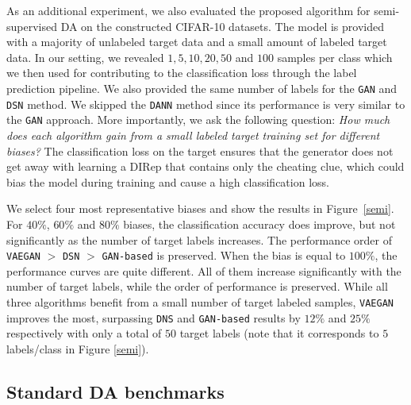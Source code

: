 \documentclass{article}
\begin{document}
As an additional experiment, we also evaluated the proposed algorithm for semi-supervised 
DA on the constructed CIFAR-10 datasets. The model is provided with a majority of unlabeled target data and a small amount of labeled target data. In our setting, we revealed $1, 5, 10, 20, 50$ and $100$ samples per class which we then used for contributing to the classification loss through the label prediction pipeline. We also provided the same number of labels for the \verb"GAN" and \verb"DSN" method. We skipped the \verb"DANN" method since its performance is very similar to the \verb"GAN" approach. More importantly, we ask the following question: \textit{How much does each algorithm gain from a small labeled target training set for different biases?} The classification loss on the target ensures that the generator does not get away with learning a DIRep that contains only the cheating clue, which could bias the model during training and cause a high classification loss.

We select four most representative biases and show the results in Figure~\ref{semi}. For $40\%$, $60\%$ and $80\%$ biases, the classification accuracy does improve, but not significantly as the number of target labels increases. The performance order of \verb"VAEGAN" $>$ \verb"DSN" $>$ \verb"GAN-based" is preserved. When the bias is equal to $100\%$, the performance curves are quite different. All of them increase significantly with the number of target labels, while the order of performance is preserved. While all three algorithms benefit from a small number of target labeled samples, \verb"VAEGAN" improves the most, surpassing \verb"DNS" and \verb"GAN-based" results by $12\%$ and $25\%$ respectively with  only a total of $50$ target labels (note that it corresponds to $5$ labels/class in Figure \ref{semi}).

\subsection{Standard DA benchmarks}
\end{document}
